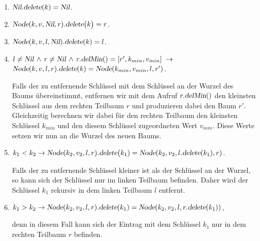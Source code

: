 \begin{enumerate}
\item $\textsl{Nil}.\textsl{delete}(k) = \textsl{Nil}$.
\item $\textsl{Node}(k,v,\textsl{Nil},r).\textsl{delete}\bigl(k\bigr) = r$.
\item $\textsl{Node}(k,v,l,\textsl{Nil}).\textsl{delete}(k) = l$.
\item $l \not= \textsl{Nil} \,\wedge\, r \not= \textsl{Nil} \,\wedge\, r.\textsl{delMin}() = [r',k_{min}, v_{min}]  \;\rightarrow$ \\[0.1cm]
      \hspace*{1.3cm}
      $\textsl{Node}(k,v,l,r).\textsl{delete}(k) = \textsl{Node}(k_{min},v_{min},l,r')$.
      
      Falls der zu entfernende Schl\"ussel mit dem Schl\"ussel an der Wurzel des Baums
      \"ubereinstimmt,  entfernen wir mit dem Aufruf $r\mathtt{.}\textsl{delMin}()$
      den kleinsten Schl\"ussel aus dem rechten Teilbaum  $r$ und produzieren dabei den Baum $r'$.
      Gleichzeitig berechnen wir dabei f\"ur den rechten Teilbaum den kleinsten Schl\"ussel $k_{min}$ und den
      diesem Schl\"ussel zugeordneten Wert $v_{min}$.  Diese Werte setzen wir nun an die
      Wurzel des neuen Baums.

\item $k_1 < k_2 \rightarrow \textsl{Node}(k_2,v_2,l,r).\textsl{delete}\bigl(k_1) = 
       \textsl{Node}(k_2,v_2,l.\textsl{delete}(k_1),r)$.

      Falls der zu entfernende Schl\"ussel kleiner ist als der Schl\"ussel an der Wurzel,
      so kann sich der Schl\"ussel nur im linken Teilbaum befinden.  Daher wird der
      Schl\"ussel $k_1$ rekursiv in dem linken Teilbaum $l$ entfernt.
\item $k_1 > k_2 \rightarrow \textsl{Node}(k_2,v_2,l,r).\textsl{delete}(k_1) = 
       \textsl{Node}(k_2,v_2,l,r.\textsl{delete}(k_1))$,

      denn in diesem Fall kann sich der Eintrag mit dem Schl\"ussel $k_1$  nur in dem
      rechten Teilbaum $r$ befinden.
\end{enumerate}

